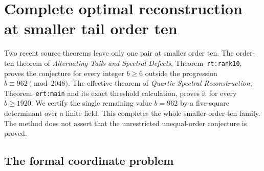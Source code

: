 \documentclass[11pt,letterpaper]{article}
\numberwithin{equation}{section}
\theoremstyle{definition}
\theoremstyle{remark}
\begin{document}


\section{Complete optimal reconstruction at smaller tail order ten}
\label{t10:section}

Two recent source theorems leave only one pair at smaller order ten.
The order-ten theorem of \emph{Alternating Tails and Spectral Defects},
Theorem~\texttt{rt:rank10}, proves the conjecture for every integer
$b\ge6$ outside the progression $b\equiv962\pmod{2048}$.
The effective theorem of \emph{Quartic Spectral Reconstruction},
Theorem~\texttt{ert:main} and its exact threshold calculation,
proves it for every $b\ge1920$. We certify the single remaining
value $b=962$ by a five-square determinant over a finite field.
This completes the whole smaller-order-ten family. The method does
not assert that the unrestricted unequal-order conjecture is proved.

\subsection{The formal coordinate problem}
\end{document}
